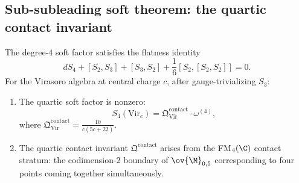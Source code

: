 \subsection{Sub-subleading soft theorem: the quartic contact invariant}

\begin{theorem}
The degree-$4$ soft factor satisfies the flatness identity
\begin{equation}
\label{eq:s4-flatness}
dS_4 + [S_2, S_3] + [S_3, S_2] + \frac{1}{6}[S_2, [S_2, S_2]] = 0.
\end{equation}
For the Virasoro algebra at central charge $c$, after gauge-trivializing $S_3$:
\begin{enumerate}[label=\textup{(\roman*)}]
\item The quartic soft factor is nonzero:
 \begin{equation}
 S_4(\mathrm{Vir}_c) = \mathfrak{Q}^{\mathrm{contact}}_{\mathrm{Vir}} \cdot
 \omega^{(4)},
 \end{equation}
 where $\mathfrak{Q}^{\mathrm{contact}}_{\mathrm{Vir}} = \frac{10}{c(5c+22)}$.
\item The quartic contact invariant $\mathfrak{Q}^{\mathrm{contact}}$ arises from
 the FM$_4(\C)$ contact stratum: the codimension-$2$ boundary of
 $\ov{\M}_{0,5}$ corresponding to four points coming together simultaneously.
\end{enumerate}
\end{theorem}

